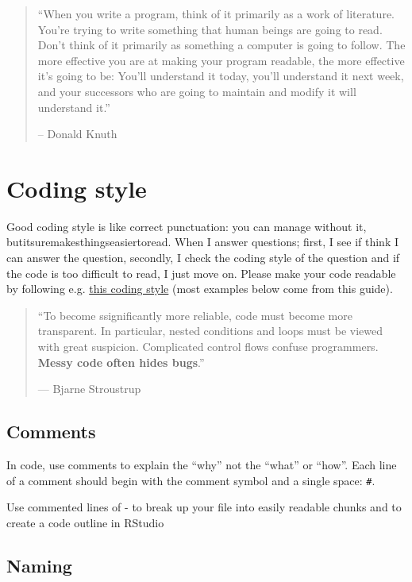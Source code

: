 \documentclass[]{book}
\theoremstyle{definition}
\theoremstyle{definition}
\theoremstyle{definition}
\theoremstyle{remark}
\let\BeginKnitrBlock\begin \let\EndKnitrBlock\end
\begin{document}
\begin{quote}
``When you write a program, think of it primarily as a work of
literature. You're trying to write something that human beings are going
to read. Don't think of it primarily as something a computer is going to
follow. The more effective you are at making your program readable, the
more effective it's going to be: You'll understand it today, you'll
understand it next week, and your successors who are going to maintain
and modify it will understand it.''

-- Donald Knuth
\end{quote}

\hypertarget{coding-style}{%
\section{Coding style}\label{coding-style}}

Good coding style is like correct punctuation: you can manage without
it, butitsuremakesthingseasiertoread. When I answer questions; first, I
see if think I can answer the question, secondly, I check the coding
style of the question and if the code is too difficult to read, I just
move on. Please make your code readable by following e.g.
\href{http://style.tidyverse.org/}{this coding style} (most examples
below come from this guide).

\begin{quote}
``To become ssignificantly more reliable, code must become more
transparent. In particular, nested conditions and loops must be viewed
with great suspicion. Complicated control flows confuse programmers.
\textbf{Messy code often hides bugs}.''

--- Bjarne Stroustrup
\end{quote}

\hypertarget{comments}{%
\subsection{Comments}\label{comments}}

In code, use comments to explain the ``why'' not the ``what'' or
``how''. Each line of a comment should begin with the comment symbol and
a single space: \texttt{\#}.

\BeginKnitrBlock{rmdtip}
Use commented lines of - to break up your file into easily readable
chunks and to create a code outline in RStudio
\EndKnitrBlock{rmdtip}

\hypertarget{naming}{%
\subsection{Naming}\label{naming}}
\end{document}
